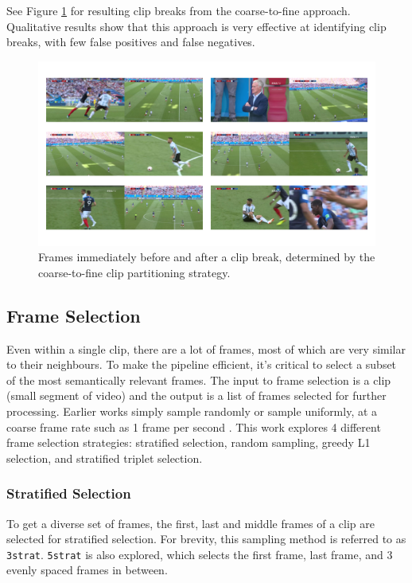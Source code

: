 See Figure \ref{fig:breaks} for resulting clip breaks from the coarse-to-fine approach.
Qualitative results show that this approach is very effective at identifying clip breaks, with few false positives and false negatives.

\begin{figure}
      \centering
      \includegraphics[width=\textwidth]{figures/breaks.png}
      \caption{Frames immediately before and after a clip break, determined by the coarse-to-fine clip partitioning strategy.}
      \label{fig:breaks}
\end{figure}


\subsection{Frame Selection}

Even within a single clip, there are a lot of frames, most of which are very similar to their neighbours.
To make the pipeline efficient, it's critical to select a subset of the most semantically relevant frames.
The input to frame selection is a clip (small segment of video) and the output is a list of frames selected for further processing.
Earlier works simply sample randomly \cite{clipbert} or sample uniformly, at a coarse frame rate such as 1 frame per second \cite{clip4clip}.
This work explores 4 different frame selection strategies:
stratified selection, random sampling, greedy L1 selection, and stratified triplet selection.

\subsubsection{Stratified Selection}
To get a diverse set of frames, the first, last and middle frames of a clip are selected for stratified selection.
For brevity, this sampling method is referred to as \verb|3strat|. 
\verb|5strat| is also explored, which selects the first frame, last frame, and 3 evenly spaced frames in between.

